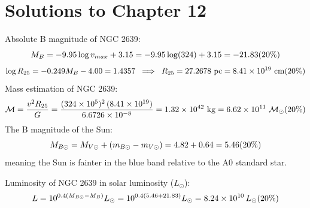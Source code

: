 \clearpage
\section*{Solutions to Chapter 12}

Absolute B magnitude of NGC 2639:
\[
M_B = -9.95 \log v_{max} + 3.15 = -9.95 \log(324) + 3.15 = -21.83
\hfill(20\%)
\]
\[
\log R_{25} = -0.249 M_B - 4.00 = 1.4357
\;\;\Longrightarrow\;\;
R_{25} = 27.2678~\mathrm{pc} = 8.41 \times 10^{19}~\mathrm{cm}
\hfill(20\%)
\]
Mass estimation of NGC 2639:
\[
\mathcal{M} = \frac{v^2 R_{25}}{G}
= \frac{(324 \times 10^{5})^{2}\,(8.41 \times 10^{19})}{6.6726 \times 10^{-8}}
= 1.32 \times 10^{42}~\mathrm{kg}
= 6.62 \times 10^{11}~\mathcal{M}_\odot
\hfill(20\%)
\]
The B magnitude of the Sun:
\[
M_{B\odot} = M_{V\odot} + (m_{B\odot} - m_{V\odot}) = 4.82 + 0.64 = 5.46
\hfill(20\%)
\]
meaning the Sun is fainter in the blue band relative to the A0 standard star.

Luminosity of NGC 2639 in solar luminosity ($L_\odot$):
\[
L = 10^{0.4(M_{B\odot} - M_B)} L_\odot
= 10^{0.4(5.46 + 21.83)} L_\odot
= 8.24 \times 10^{10}\,L_\odot
\hfill(20\%)
\]


